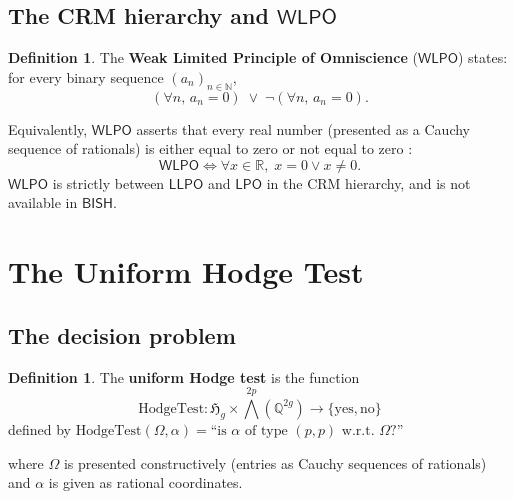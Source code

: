 \documentclass[11pt]{article}
\theoremstyle{plain}
\theoremstyle{definition}
\newtheorem{definition}[theorem]{Definition}
\theoremstyle{remark}
\newcommand{\N}{\mathbb{N}}
\newcommand{\Q}{\mathbb{Q}}
\newcommand{\R}{\mathbb{R}}
\newcommand{\Hg}{\mathfrak{H}_g}
\newcommand{\BISH}{\ensuremath{\mathsf{BISH}}}
\newcommand{\LPO}{\ensuremath{\mathsf{LPO}}}
\newcommand{\WLPO}{\ensuremath{\mathsf{WLPO}}}
\newcommand{\LLPO}{\ensuremath{\mathsf{LLPO}}}
\begin{document}
\subsection{The CRM hierarchy and $\WLPO$}

\begin{definition}
The \textbf{Weak Limited Principle of Omniscience} ($\WLPO$) states: for every binary sequence $(a_n)_{n \in \N}$,
\[
(\forall n, \, a_n = 0) \; \lor \; \lnot(\forall n, \, a_n = 0).
\]
\end{definition}

Equivalently, $\WLPO$ asserts that every real number (presented as a Cauchy sequence of rationals) is either equal to zero or not equal to zero \cite{BridgesRichman1987}:
\[
\WLPO \iff \forall x \in \R, \; x = 0 \lor x \neq 0.
\]
$\WLPO$ is strictly between $\LLPO$ and $\LPO$ in the CRM hierarchy, and is not available in $\BISH$.

\section{The Uniform Hodge Test}\label{sec:test}

\subsection{The decision problem}

\begin{definition}\label{def:hodge-test}
The \textbf{uniform Hodge test} is the function
\[
\mathrm{HodgeTest} : \Hg \times \bigwedge^{2p}(\Q^{2g}) \to \{\mathrm{yes}, \mathrm{no}\}
\]
defined by $\mathrm{HodgeTest}(\Omega, \alpha) = \text{``is } \alpha \text{ of type } (p,p) \text{ w.r.t.\ } \Omega \text{?''}$

where $\Omega$ is presented constructively (entries as Cauchy sequences of rationals) and $\alpha$ is given as rational coordinates.
\end{definition}
\end{document}
